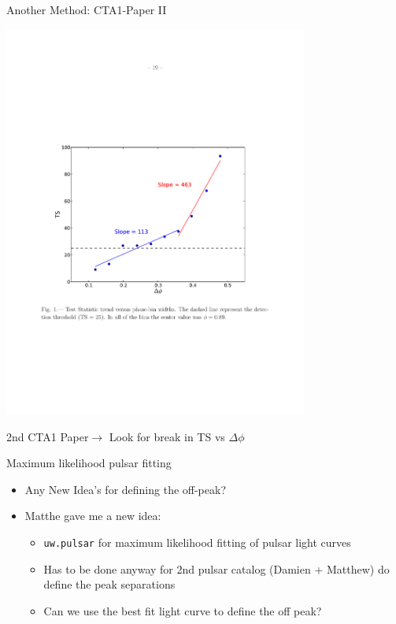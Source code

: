 \documentclass[12pt]{beamer}
\begin{document}
\begin{frame}{Another Method: CTA1-Paper II}

  \includegraphics[width=0.75\textwidth]{plots/cta1.pdf}

  2nd CTA1 Paper$\rightarrow$ Look for break in TS vs $\Delta \phi$

\end{frame}

\begin{frame}{Maximum likelihood pulsar fitting}
  \begin{itemize}
    \item Any New Idea's for defining the off-peak?
    \item Matthe gave me a new idea:
      \begin{itemize}
   \item \texttt{uw.pulsar} for maximum likelihood fitting of pulsar light curves
   \item Has to be done anyway for 2nd pulsar catalog (Damien + Matthew)
     do define the peak separations
   \item Can we use the best fit light curve to define the off peak?
  \end{itemize}
  \end{itemize}
\end{frame}
\end{document}
